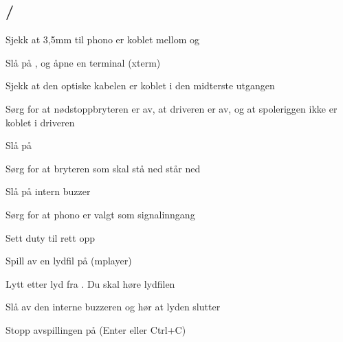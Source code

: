 \subsection{\Signalkilde/\Pulsformer}
\begin{todolist}
    \item{Sjekk at 3,5mm til phono er koblet mellom \signalkilde og \pulsformer}
    \item{Slå på \signalkilde, og åpne en terminal (xterm)}
    \item{Sjekk at den optiske kabelen er koblet i den midterste utgangen}
    \item{Sørg for at nødstoppbryteren er av, at driveren er av, og at spoleriggen ikke er koblet i driveren}
    \item{Slå på \pulsformer}
    \item{Sørg for at bryteren som skal stå ned står ned}
    \item{Slå på intern buzzer}
    \item{Sørg for at phono er valgt som signalinngang}
    \item{Sett duty til rett opp}
    \item{Spill av en lydfil på \signalkilde { }(mplayer)}
    \item{Lytt etter lyd fra \pulsformer. Du skal høre lydfilen}
    \item{Slå av den interne buzzeren og hør at lyden slutter}
    \item{Stopp avspillingen på \signalkilde { }(Enter eller Ctrl+C)}
\end{todolist}